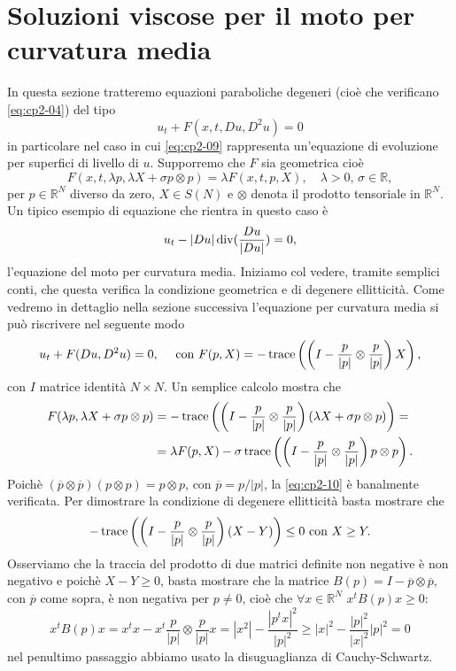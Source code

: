 \section{Soluzioni viscose per il moto per curvatura media}
In questa sezione tratteremo equazioni paraboliche degeneri (cioè che verificano \eqref{eq:cp2-04}) del tipo
\begin{equation}
  \label{eq:cp2-09}
u_t + F(x,t,Du,D^2u) = 0
\end{equation}
in particolare nel caso in cui \eqref{eq:cp2-09} rappresenta un'equazione di evoluzione per superfici di livello di $u$.  Supporremo che $F$ sia geometrica cioè
\begin{equation}
  \label{eq:cp2-10}
F(x,t,\lambda p,\lambda X + \sigma p\otimes p) = \lambda F(x,t,p,X),\quad\lambda>0,\,\sigma\in\mathbb{R},
\end{equation}
per $p\in\mathbb{R}^N$ diverso da zero, $X\in S(N)$ e $\otimes$ denota il prodotto tensoriale in $\mathbb{R}^N$. Un tipico esempio di equazione che rientra in questo caso è
\[
u_t - |Du|\operatorname{div}(\frac{Du}{|Du|}) = 0,
\]
l'equazione del moto per curvatura media. Iniziamo col vedere, tramite semplici conti, che questa verifica la condizione geometrica e di degenere ellitticità.
Come vedremo in dettaglio nella sezione successiva l'equazione per curvatura media si può riscrivere nel seguente modo
\[
u_t+F(Du,D^2u)=0,\quad\text{ con }F(p,X) = -\operatorname{trace}\left(\left(I-\frac{p}{|p|}\otimes\frac{p}{|p|}\right)X\right),
\]
con $I$ matrice identità $N\times N$.
Un semplice calcolo mostra che
\[
\begin{aligned}
F(\lambda p,\lambda X +\sigma p\otimes p)&=-\operatorname{trace}\left(\left(I-\frac{p}{|p|}\otimes\frac{p}{|p|}\right)\left(\lambda X+\sigma p\otimes p\right)\right)=\\
&=\lambda F(p,X)-\sigma\operatorname{trace}\left(\left(I-\frac{p}{|p|}\otimes\frac{p}{|p|}\right)p\otimes p\right).
\end{aligned}
\]
Poichè $(\overline{p}\otimes\overline{p})(p\otimes p)=p\otimes p$, con $\overline{p}=p/|p|$, la \eqref{eq:cp2-10} è banalmente verificata. Per dimostrare la condizione di degenere ellitticità basta mostrare che
\[
-\operatorname{trace}\left(\left(I-\frac{p}{|p|}\otimes\frac{p}{|p|}\right)\left(X-Y\right)\right)\leq 0\text{ con }X\geq Y.
\]
Osserviamo che la traccia del prodotto di due matrici definite non
negative è non negativo e poichè $X-Y\geq 0$,  basta mostrare che la matrice $B(p)= I-\overline{p}\otimes\overline{p}$, con $\overline{p}$ come sopra, è non negativa per $p\ne 0$, cioè che $\forall x\in\mathbb{R}^N$ $x^tB(p)x\geq 0$:
\[
x^tB(p)x=x^tx-x^t\frac{p}{|p|}\otimes\frac{p}{|p|}x=|x^2|-\frac{|p^tx|^2}{|p|^2}\geq |x|^2-\frac{|p|^2}{|x|^2}{|p|^2}=0
\]
nel penultimo passaggio abbiamo usato la disuguaglianza di Cauchy-Schwartz.

